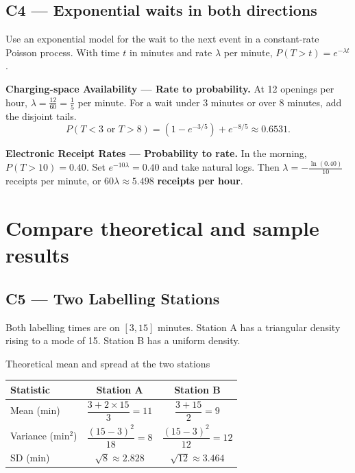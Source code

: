 \subsection*{C4 --- Exponential waits in both directions}

Use an exponential model for the wait to the next event in a constant-rate Poisson process. With time \(t\) in minutes and rate \(\lambda\) per minute, \(P(T>t)=e^{-\lambda t}\).

\textbf{Charging-space Availability --- Rate to probability.} At 12 openings per hour, \(\lambda=\frac{12}{60}=\frac{1}{5}\) per minute. For a wait under 3 minutes or over 8 minutes, add the disjoint tails.
\[
  P(T<3\text{ or }T>8)=(1-e^{-3/5})+e^{-8/5}\approx0.6531.
\]

\textbf{Electronic Receipt Rates --- Probability to rate.} In the morning, \(P(T>10)=0.40\). Set \(e^{-10\lambda}=0.40\) and take natural logs. Then \(\lambda=-\frac{\ln(0.40)}{10}\) receipts per minute, or \(60\lambda\approx\mathbf{5.498}\) \textbf{receipts per hour}.

\clearpage
\section{Compare theoretical and sample results}

\subsection*{C5 --- Two Labelling Stations}

Both labelling times are on \([3,15]\) minutes. Station A has a triangular density rising to a mode of 15. Station B has a uniform density.

\begin{center}
  {\small Theoretical mean and spread at the two stations\par}\smallskip
  \begin{tabular}{@{}lcc@{}}
    \toprule
    \textbf{Statistic} & \textbf{Station A} & \textbf{Station B}\\
    \midrule
    Mean (min) & \(\dfrac{3+2\times15}{3}=11\) & \(\dfrac{3+15}{2}=9\)\\[8pt]
    Variance (\(\mathrm{min}^2\)) & \(\dfrac{(15-3)^2}{18}=8\) & \(\dfrac{(15-3)^2}{12}=12\)\\[8pt]
    SD (min) & \(\sqrt{8}\approx2.828\) & \(\sqrt{12}\approx3.464\)\\
    \bottomrule
  \end{tabular}
\end{center}

